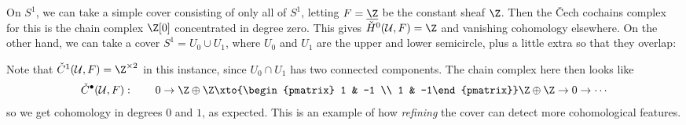 \documentclass[11pt]{book}
\begin{document}
\begin{example}\label{exa:s1-north-south-cech-cohomology} 
On $S^1$, we can take a simple cover consisting of only all of $S^1$, letting $F=\underline{\Z}$ be the constant sheaf $\Z$. Then the \v{C}ech cochains complex for this is the chain complex $\Z[0]$ concentrated in degree zero. This gives $\check{H}^0(\mathcal{U},F) = \Z$ and vanishing cohomology elsewhere. On the other hand, we can take a cover $S^1 = U_0 \cup U_1$, where $U_0$ and $U_1$ are the upper and lower semicircle, plus a little extra so that they overlap:
\begin{center}
\begin{figure}[H]
\end{figure}
\end{center}
Note that $\check{C}^1(\mathcal{U},F) = \Z^{\times 2}$ in this instance, since $U_0 \cap U_1$ has two connected components. The chain complex here then looks like
\begin{align*}
    \check{C}^\bullet(\mathcal{U},F) : \quad\quad 0 \to \Z \oplus \Z \xto{\begin{pmatrix} 1 & -1 \\ 1 & -1\end{pmatrix}} \Z \oplus \Z \to 0 \to \cdots
\end{align*}
so we get cohomology in degrees $0$ and $1$, as expected. This is an example of how \emph{refining} the cover can detect more cohomological features.
\end{example}
\end{document}
